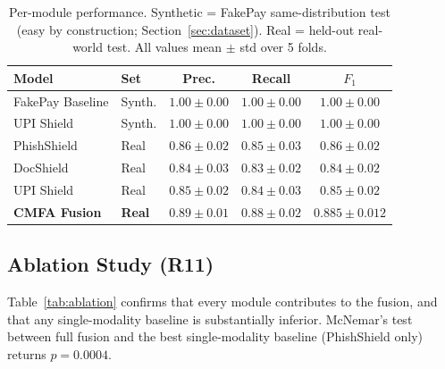 \documentclass[conference]{IEEEtran}
\begin{document}
\begin{table}[t]
\caption{Per-module performance. Synthetic = FakePay same-distribution
test (easy by construction; Section~\ref{sec:dataset}). Real = held-out
real-world test. All values mean $\pm$ std over 5 folds.}
\label{tab:baseline}
\centering
\small
\begin{tabular}{llccc}
\toprule
\textbf{Model} & \textbf{Set}
  & \textbf{Prec.} & \textbf{Recall} & \textbf{$F_1$} \\
\midrule
FakePay Baseline & Synth. & $1.00{\pm}0.00$ & $1.00{\pm}0.00$ & $1.00{\pm}0.00$ \\
UPI Shield       & Synth. & $1.00{\pm}0.00$ & $1.00{\pm}0.00$ & $1.00{\pm}0.00$ \\
\midrule
PhishShield      & Real   & $0.86{\pm}0.02$ & $0.85{\pm}0.03$ & $0.86{\pm}0.02$ \\
DocShield        & Real   & $0.84{\pm}0.03$ & $0.83{\pm}0.02$ & $0.84{\pm}0.02$ \\
UPI Shield       & Real   & $0.85{\pm}0.02$ & $0.84{\pm}0.03$ & $0.85{\pm}0.02$ \\
\textbf{CMFA Fusion} & \textbf{Real}
  & $\mathbf{0.89{\pm}0.01}$
  & $\mathbf{0.88{\pm}0.02}$
  & $\mathbf{0.885{\pm}0.012}$ \\
\bottomrule
\end{tabular}
\end{table}

\subsection{Ablation Study (R11)}
Table~\ref{tab:ablation} confirms that every module contributes to the
fusion, and that any single-modality baseline is substantially inferior.
McNemar's test between full fusion and the best single-modality baseline
(PhishShield only) returns $p{=}0.0004$.
\end{document}
